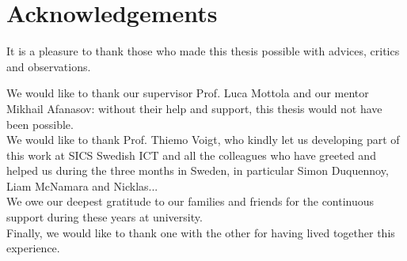 \chapter*{Acknowledgements}


\noindent
It is a pleasure to thank those who made this thesis possible with advices, critics and observations.

\noindent
We would like to thank our supervisor Prof. Luca Mottola and our mentor Mikhail Afanasov: without their help and support, this thesis would not have been possible.\\

\noindent
We would like to thank Prof. Thiemo Voigt, who kindly let us developing part of this work at SICS Swedish ICT and all the colleagues who have greeted and helped us during the three months in Sweden, in particular Simon Duquennoy, Liam McNamara and Nicklas...\\

\noindent
We owe our deepest gratitude to our families and friends for the continuous support during these years at university.\\

\noindent
Finally, we would like to thank one with the other for having lived together this experience.\\